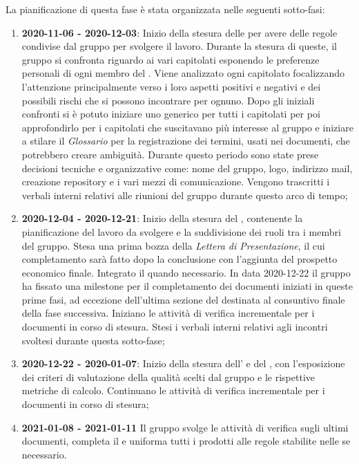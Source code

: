 La pianificazione di questa fase è stata organizzata nelle seguenti sotto-fasi:
\begin{enumerate}
\item \textbf{2020-11-06 - 2020-12-03}:
Inizio della stesura delle \textit{\NdP} per avere delle regole condivise dal gruppo per svolgere il lavoro. Durante la stesura di queste, il gruppo si confronta riguardo ai vari capitolati esponendo le preferenze personali di ogni membro del . Viene analizzato ogni capitolato focalizzando l'attenzione principalmente verso i loro aspetti positivi e negativi e dei possibili rischi che si possono incontrare per ognuno. Dopo gli iniziali confronti si è potuto iniziare uno \textit{\SdF} generico per tutti i capitolati per poi approfondirlo per i capitolati che suscitavano più interesse al gruppo e iniziare a stilare il \textit{Glossario} per la registrazione dei termini, usati nei documenti, che potrebbero creare ambiguità. Durante questo periodo sono state prese decisioni tecniche e organizzative come: nome del gruppo, logo, indirizzo mail, creazione repository e i vari mezzi di comunicazione. Vengono trascritti i verbali interni relativi alle riunioni del gruppo durante questo arco di tempo;
\item \textbf{2020-12-04 - 2020-12-21}:
Inizio della stesura del \textit{\PdP}, contenente la pianificazione del lavoro da svolgere e la suddivisione dei ruoli tra i membri del gruppo. Stesa una prima bozza della \textit{Lettera di Presentazione}, il cui completamento sarà fatto dopo la conclusione \textit{\PdP} con l'aggiunta del prospetto economico finale. Integrato il \textit{\Glossario} quando necessario. In data 2020-12-22 il gruppo ha fissato una milestone per il completamento dei documenti iniziati in queste prime fasi, ad eccezione dell'ultima sezione del \textit{\PdP} destinata al consuntivo finale della fase successiva. Iniziano le attività di verifica incrementale per i documenti in corso di stesura. Stesi i verbali interni relativi agli incontri svoltesi durante questa sotto-fase;
\item \textbf{2020-12-22 - 2020-01-07}:
    Inizio della stesura dell'\textit{\AdR} e del \textit{\PdQ}, con l'esposizione dei criteri di valutazione della qualità scelti dal gruppo e le rispettive metriche di calcolo. Continuano le attività di verifica incrementale per i documenti in corso di stesura;
\item \textbf{2021-01-08 - 2021-01-11}
    Il gruppo svolge le attività di verifica sugli ultimi documenti, completa il \textit{\Glossario} e uniforma tutti i prodotti alle regole stabilite nelle \textit{\NdP} se necessario.
\end{enumerate}

